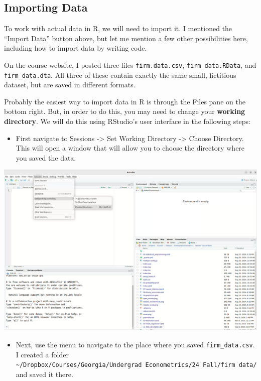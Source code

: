 \documentclass[
  letterpaper,
  DIV=11,
  numbers=noendperiod]{scrreprt}
\providecommand{\tightlist}{%
  \setlength{\itemsep}{0pt}\setlength{\parskip}{0pt}}\usepackage{longtable,booktabs,array}
\begin{document}
\subsection{Importing Data}\label{importing-data}

To work with actual data in R, we will need to import it. I mentioned
the ``Import Data'' button above, but let me mention a few other
possibilities here, including how to import data by writing code.

On the course website, I posted three files \texttt{firm.data.csv},
\texttt{firm\_data.RData}, and \texttt{firm\_data.dta}. All three of
these contain exactly the same small, fictitious dataset, but are saved
in different formats.

Probably the easiest way to import data in R is through the Files pane
on the bottom right. But, in order to do this, you may need to change
your \textbf{working directory}. We will do this using RStudio's user
interface in the following steps:

\begin{itemize}
\tightlist
\item
  First navigate to Sessions -\textgreater{} Set Working Directory
  -\textgreater{} Choose Directory. This will open a window that will
  allow you to choose the directory where you saved the data.
\end{itemize}

\includegraphics{set_wd.png}

\begin{itemize}
\tightlist
\item
  Next, use the menu to navigate to the place where you saved
  \texttt{firm\_data.csv}. I created a folder
  \texttt{\textasciitilde{}/Dropbox/Courses/Georgia/Undergrad\ Econometrics/24\ Fall/firm\ data/}
  and saved it there.
\end{itemize}
\end{document}
